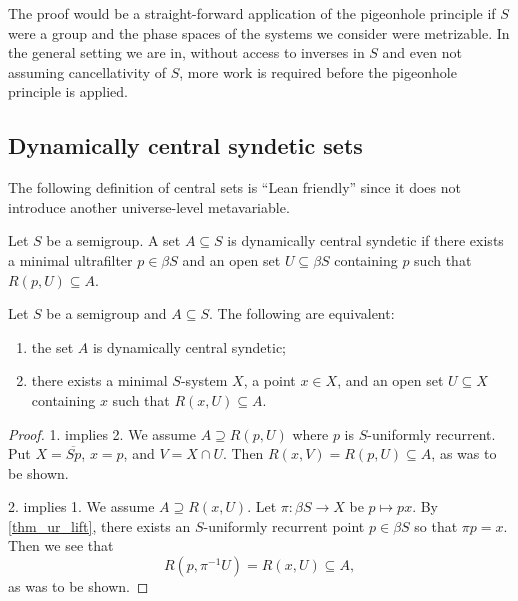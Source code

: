 \begin{remark}
The proof would be a straight-forward application of the pigeonhole principle if $S$ were a group and the phase spaces of the systems we consider were metrizable. In the general setting we are in, without access to inverses in $S$ and even not assuming cancellativity of $S$, more work is required before the pigeonhole principle is applied.
\end{remark}

\subsection{Dynamically central syndetic sets}

The following definition of central sets is ``Lean friendly'' since it does not introduce another universe-level metavariable.

\begin{definition}
    Let $S$ be a semigroup.  A set $A \subseteq S$ is dynamically central syndetic if there exists a minimal ultrafilter $p \in \beta S$ and an open set $U \subseteq \beta S$ containing $p$ such that $R(p,U) \subseteq A$.
\end{definition}


\begin{theorem}
    Let $S$ be a semigroup and $A \subseteq S$.  The following are equivalent:
    \begin{enumerate}
        \item the set $A$ is dynamically central syndetic;

        \item there exists a minimal $S$-system $X$, a point $x \in X$, and an open set $U \subseteq X$ containing $x$ such that $R(x,U) \subseteq A$.
    \end{enumerate}
\end{theorem}

\begin{proof}
    1. implies 2. We assume $A \supseteq R(p,U)$ where $p$ is $S$-uniformly recurrent.  Put $X = \overline{Sp}$, $x = p$, and $V = X \cap U$.  Then $R(x,V) = R(p,U) \subseteq A$, as was to be shown.

    2. implies 1.  We assume $A \supseteq R(x,U)$.  Let $\pi: \beta S \to X$ be $p \mapsto px$.  By \cref{thm_ur_lift}, there exists an $S$-uniformly recurrent point $p \in \beta S$ so that $\pi p = x$.  Then we see that
    \[R(p,\pi^{-1}U) = R(x,U) \subseteq A,\]
    as was to be shown.
\end{proof}

